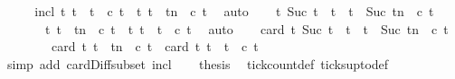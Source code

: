 \begin{isabellebody}
%
\isadelimproof
%
\endisadelimproof
%
\isatagproof
{}\isamarkupfalse%
\ {\isacharminus}\isanewline
\ \ \isamarkupfalse%
\ incl{\isacharcolon}\ {\isacartoucheopen}{\isacharbraceleft}t{\isachardot}\ t\ {\isasymle}\ t\ {\isasymand}\ c\ t{\isacharbraceright}\ {\isasymsubseteq}\ {\isacharbraceleft}t{\isachardot}\ t\ {\isasymle}\ tn\ {\isasymand}\ c\ t{\isacharbraceright}{\isacartoucheclose}\ \isamarkupfalse%
\ auto\isanewline
\ \ \isamarkupfalse%
\ {\isacartoucheopen}{\isacharbraceleft}t{\isachardot}\ {\isacharparenleft}Suc\ t\ {\isasymle}\ t\ {\isasymand}\ t\ {\isacharless}\ {\isacharparenleft}Suc\ tn\ {\isasymand}\ c\ t{\isacharbraceright}\isanewline
\ \ \ \ \ \ {\isacharequal}\ {\isacharbraceleft}t{\isachardot}\ t\ {\isasymle}\ tn\ {\isasymand}\ c\ t{\isacharbraceright}\ {\isacharminus}\ {\isacharbraceleft}t{\isachardot}\ t\ {\isasymle}\ t\ {\isasymand}\ c\ t{\isacharbraceright}{\isacartoucheclose}\ \isamarkupfalse%
\ auto\isanewline
\ \ \isamarkupfalse%
\ {\isacartoucheopen}card\ {\isacharbraceleft}t{\isachardot}\ {\isacharparenleft}Suc\ t\ {\isasymle}\ t\ {\isasymand}\ t\ {\isacharless}\ {\isacharparenleft}Suc\ tn\ {\isasymand}\ c\ t{\isacharbraceright}\isanewline
\ \ \ \ \ \ \ {\isacharequal}\ card\ {\isacharbraceleft}t{\isachardot}\ t\ {\isasymle}\ tn\ {\isasymand}\ c\ t{\isacharbraceright}\ {\isacharminus}\ card\ {\isacharbraceleft}t{\isachardot}\ t\ {\isasymle}\ t\ {\isasymand}\ c\ t{\isacharbraceright}{\isacartoucheclose}\isanewline
\ \ \ \ \isamarkupfalse%
\ {\isacharparenleft}simp\ add{\isacharcolon}\ card{\isacharunderscore}Diff{\isacharunderscore}subset\ incl{\isacharparenright}\isanewline
\ \ \isamarkupfalse%
\ {\isacharquery}thesis\ \isamarkupfalse%
\ tick{\isacharunderscore}count{\isacharunderscore}def\ ticks{\isacharunderscore}up{\isacharunderscore}to{\isacharunderscore}def\ \isacommand{{\isachardot}}\isamarkupfalse%
\isanewline
{}\isamarkupfalse%
%
\endisatagproof
{\isafoldproof}%
%
\isadelimproof
%
\endisadelimproof
%
\begin{isamarkuptext}%

\end{isamarkuptext}
\end{isabellebody}
